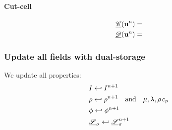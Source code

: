 \documentclass[]{article}
\begin{document}
\paragraph{Cut-cell}
\begin{align}
	\underline{\mathcal{C}}(\ve{u}^{n}) &= \\
	\underline{\mathcal{D}}(\ve{u}^{n}) &=
\end{align}

\subsubsection{Update all fields with dual-storage}
We update all properties:
\begin{align} 
	&I \into I^{n+1} \\
	&\rho \into \rho^{n+1} \qetq \mu, \lambda, \rhoCp  \code{  --> gp_.calculer_rho_mu_indic();}
	\\
	&\phi \into \phi^{n+1} \code{  --> gp_.calculer_eulerian_potentiel();} \\
	&\underline{\mathcal{S}}_\sigma \into \underline{\mathcal{S}}_\sigma^{n+1} \code{  --> gp_.calculer_eulerian_potentiel();} 
\end{align}

\printbibliography
\end{document}
